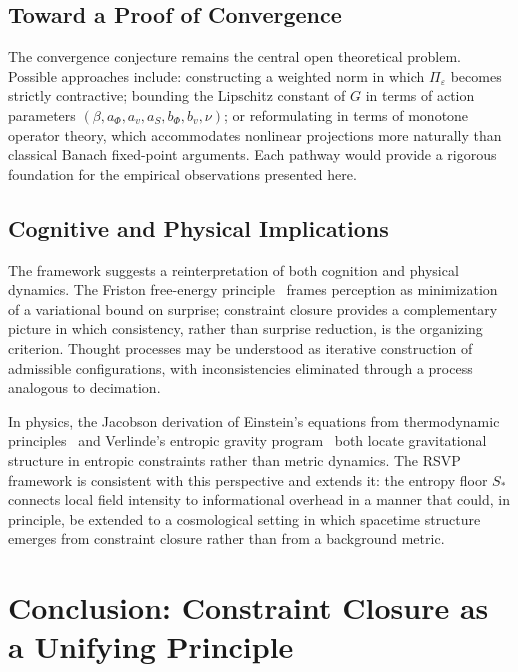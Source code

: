 \documentclass[11pt]{article}
\theoremstyle{definition}
\begin{document}
\subsection{Toward a Proof of Convergence}

The convergence conjecture remains the central open theoretical problem.
Possible approaches include: constructing a weighted norm in which
$\Pi_\varepsilon$ becomes strictly contractive; bounding the Lipschitz constant
of $G$ in terms of action parameters $(\beta, a_\Phi, a_v, a_S, b_\Phi, b_v,
\nu)$; or reformulating in terms of monotone operator theory, which accommodates
nonlinear projections more naturally than classical Banach fixed-point
arguments. Each pathway would provide a rigorous foundation for the empirical
observations presented here.

\subsection{Cognitive and Physical Implications}

The framework suggests a reinterpretation of both cognition and physical
dynamics. The Friston free-energy principle~\cite{friston2010} frames
perception as minimization of a variational bound on surprise; constraint
closure provides a complementary picture in which consistency, rather than
surprise reduction, is the organizing criterion. Thought processes may be
understood as iterative construction of admissible configurations, with
inconsistencies eliminated through a process analogous to decimation.

In physics, the Jacobson derivation of Einstein's equations from thermodynamic
principles~\cite{jacobson1995} and Verlinde's entropic gravity
program~\cite{verlinde2011} both locate gravitational structure in entropic
constraints rather than metric dynamics. The RSVP framework is consistent with
this perspective and extends it: the entropy floor $S_*$ connects local field
intensity to informational overhead in a manner that could, in principle, be
extended to a cosmological setting in which spacetime structure emerges from
constraint closure rather than from a background metric.

\section{Conclusion: Constraint Closure as a Unifying Principle}
\end{document}
